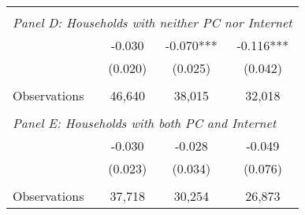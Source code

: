 {\begin{tabular}{lccc}
&  &  &   \\
\multicolumn{4}{l}{\textit{Panel D: Households with neither PC nor Internet}} \\
\hspace{3mm}        &      -0.030   &      -0.070***&      -0.116***\\
                    &     (0.020)   &     (0.025)   &     (0.042)   \\
                    &               &               &               \\
\hspace{3mm}Observations&      46,640   &      38,015   &      32,018   \\
 
&  &  &   \\
\multicolumn{4}{l}{\textit{Panel E: Households with both PC and Internet}} \\
\hspace{3mm}        &      -0.030   &      -0.028   &      -0.049   \\
                    &     (0.023)   &     (0.034)   &     (0.076)   \\
                    &               &               &               \\
\hspace{3mm}Observations&      37,718   &      30,254   &      26,873   \\
 

\bottomrule
\end{tabular}
}
